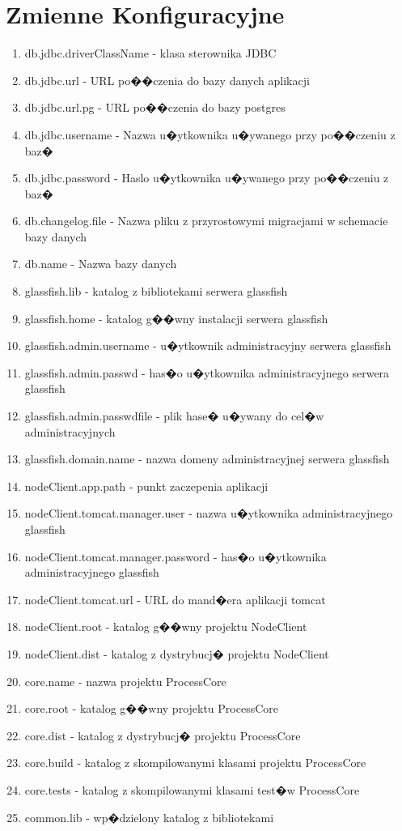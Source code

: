 \documentclass{article}
\begin{document}
\section{Zmienne Konfiguracyjne}
{\small
\begin{enumerate}

\item db.jdbc.driverClassName - klasa sterownika JDBC
\item db.jdbc.url - URL po��czenia do bazy danych aplikacji
\item db.jdbc.url.pg - URL po��czenia do bazy postgres
\item db.jdbc.username - Nazwa u�ytkownika u�ywanego przy po��czeniu z baz�
\item db.jdbc.password - Haslo u�ytkownika u�ywanego przy po��czeniu z baz�
\item db.changelog.file - Nazwa pliku z przyrostowymi migracjami w schemacie bazy danych
\item db.name - Nazwa bazy danych

\item glassfish.lib - katalog z bibliotekami serwera glassfish
\item glassfish.home - katalog g��wny instalacji serwera glassfish
\item glassfish.admin.username - u�ytkownik administracyjny serwera glassfish
\item glassfish.admin.passwd - has�o u�ytkownika administracyjnego serwera glassfish
\item glassfish.admin.passwdfile - plik hase� u�ywany do cel�w administracyjnych
\item glassfish.domain.name - nazwa domeny administracyjnej serwera glassfish

\item nodeClient.app.path - punkt zaczepenia aplikacji 
\item nodeClient.tomcat.manager.user - nazwa u�ytkownika administracyjnego glassfish
\item nodeClient.tomcat.manager.password - has�o u�ytkownika administracyjnego glassfish
\item nodeClient.tomcat.url - URL do mand�era aplikacji tomcat
\item nodeClient.root - katalog g��wny projektu NodeClient
\item nodeClient.dist - katalog z dystrybucj� projektu NodeClient

\item core.name - nazwa projektu ProcessCore
\item core.root - katalog g��wny projektu ProcessCore
\item core.dist - katalog z dystrybucj� projektu ProcessCore
\item core.build - katalog z skompilowanymi klasami projektu ProcessCore
\item core.tests - katalog z skompilowanymi klasami test�w ProcessCore
\item common.lib - wp�dzielony katalog z bibliotekami 


\end{enumerate}}
\end{document}
